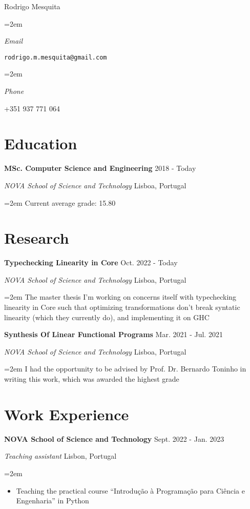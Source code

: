 \documentclass{article}
\newlength{\spacebox}
\newcommand{\name}[1]{\huge#1\normalsize\par\vspace*{0.5em}}
\newcommand{\info}[2]{
  \noindent\hangindent=2em\hangafter=0
  \parbox{\spacebox}{%
  \textsl{#1}} %
  #2 \par} %
\newcommand{\sientry}[4]{
  \noindent  \textbf{#1}
    \hfill \small #3 \normalsize \par
  \noindent \textit{#2}
    \hfill \small #4 \normalsize \par
}
\newcommand{\entry}[5]{
  \sientry{#1}{#2}{#3}{#4}
     \noindent\hangindent=2em\hangafter=0 \small #5
\normalsize \par
}
\begin{document}
\name{Rodrigo Mesquita}
\info{Email}{\texttt{rodrigo.m.mesquita@gmail.com}}
\info{Phone}{+351 937 771 064}


\section*{Education}

  \entry
    {MSc. Computer Science and Engineering}
    {NOVA School of Science and Technology}
    {2018 - Today}
    {Lisboa, Portugal}
    {Current average grade: 15.80}

\section*{Research}

  \entry
    {Typechecking Linearity in Core}
    {NOVA School of Science and Technology}
    {Oct. 2022 - Today}
    {Lisboa, Portugal}
    {The master thesis I'm working on concerns itself with typechecking
    linearity in Core such that optimizing transformations don't break syntatic
    linearity (which they currently do), and implementing it on GHC}

  \entry
    {Synthesis Of Linear Functional Programs}
    {NOVA School of Science and Technology}
    {Mar. 2021 - Jul. 2021}
    {Lisboa, Portugal}
    {I had the opportunity to be advised by Prof. Dr. Bernardo Toninho in
    writing this work, which was awarded the highest grade}

\section*{Work Experience}

  \entry
    {NOVA School of Science and Technology}
    {Teaching assistant}
    {Sept. 2022 - Jan. 2023}
    {Lisbon, Portugal}
    {
      \begin{itemize}
          \item {Teaching the practical course ``Introdução à Programação para
              Ciência e Engenharia'' in Python}
      \end{itemize}
    }
\end{document}
